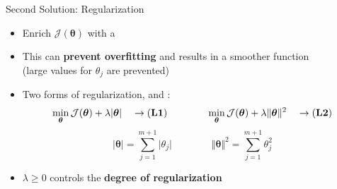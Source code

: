\begin{frame}{Second Solution: Regularization}{}
	\begin{itemize}
		\item Enrich $\mathcal{J}(\bm{\theta})$ with a 
		\item This can \textbf{prevent overfitting} and results in a smoother function \\
			(large values for $\theta_j$ are prevented)
		\item Two forms of regularization,  and :
		\begin{equation*}
			\min_{\bm{\theta}} \mathcal{J}(\bm{\theta}) + \lambda \vert \bm{\theta} \vert
			\quad \rightarrow \text{(\textbf{L1})}
			\qquad\qquad
			\min_{\bm{\theta}} \mathcal{J}(\bm{\theta}) + \lambda \Vert \bm{\theta} \Vert^2
			\quad \rightarrow \text{(\textbf{L2})}
		\end{equation*}
		\vspace*{-3mm}
		\begin{equation*}
			\vert \bm{\theta} \vert = \sum_{j=1}^{m+1} \vert \theta_j \vert
			\qquad\qquad
			\Vert \bm{\theta} \Vert^2 = \sum_{j=1}^{m+1} \theta_j^2
		\end{equation*}
		\item $\lambda \ge 0$ controls the \textbf{degree of regularization}
	\end{itemize}
\end{frame}


